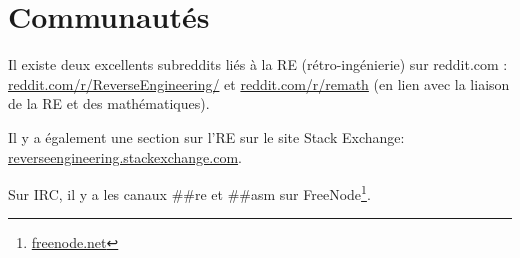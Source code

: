 \chapter{Communautés}

Il existe deux excellents subreddits liés à la \ac{RE} (rétro-ingénierie) sur reddit.com :\\
\href{http://www.reddit.com/r/ReverseEngineering/}{reddit.com/r/ReverseEngineering/} et
\href{http://www.reddit.com/r/remath}{reddit.com/r/remath}
(en lien avec la liaison de la \ac{RE} et des mathématiques).

Il y a également une section sur l'\ac{RE} sur le site Stack Exchange:\\
\href{http://reverseengineering.stackexchange.com/}{reverseengineering.stackexchange.com}.

Sur IRC, il y a les canaux \#\#re et \#\#asm sur
FreeNode\footnote{\href{https://freenode.net/}{freenode.net}}.

